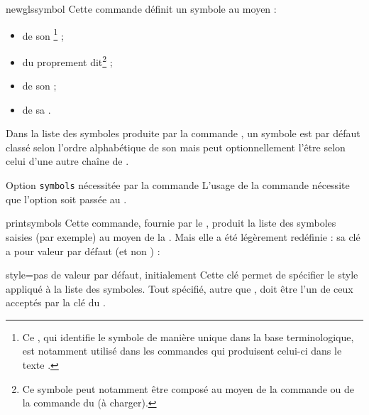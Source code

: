 \begin{docCommand}{newglssymbol}{}
  Cette commande définit un symbole au moyen :
  \begin{itemize}
  \item de son \footnote{Ce , qui identifie le symbole de
      manière unique dans la base terminologique, est notamment utilisé dans
      les commandes qui produisent celui-ci dans le texte .} ;
\item du  proprement dit\footnote{Ce symbole peut notamment être
    composé au moyen de la commande  ou de la commande 
    du  (à charger).} ;
  \item de son  ;
  \item de sa .
  \end{itemize}
  Dans la liste des symboles produite par la commande , un
  symbole est par défaut classé selon l'ordre alphabétique de son 
  mais peut optionnellement l'être selon celui d'une autre chaîne de
  .
\end{docCommand}

\begin{dbwarning}{Option \texttt{symbols} nécessitée par la commande
    \protect{}}{}
  L'usage de la commande  nécessite que l'option
   soit passée au .
\end{dbwarning}

\begin{docCommand}{printsymbols}{}
  Cette commande, fournie par le , produit la liste des
  symboles saisies (par exemple) au moyen de la . Mais
  elle a été légèrement redéfinie : sa clé  a pour valeur par
  défaut  (et non ) :
  \begin{docKey}{style}{=\textbar{}}{pas de valeur
      par défaut, initialement }
    Cette clé permet de spécifier le style appliqué à la liste des
    symboles. Tout  spécifié, autre que ,
    doit être l'un de ceux acceptés par la clé  du
    .
  \end{docKey}
\end{docCommand}

